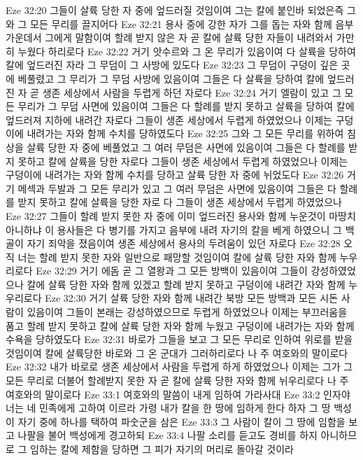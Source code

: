 Eze 32:20  그들이 살륙 당한 자 중에 엎드러질 것임이여 그는 칼에 붙인바 되었은즉 그와 그 모든 무리를 끌지어다
Eze 32:21  용사 중에 강한 자가 그를 돕는 자와 함께 음부 가운데서 그에게 말함이여 할례 받지 않은 자 곧 칼에 살륙 당한 자들이 내려와서 가만히 누웠다 하리로다
Eze 32:22  거기 앗수르와 그 온 무리가 있음이여 다 살륙을 당하여 칼에 엎드러진 자라 그 무덤이 그 사방에 있도다
Eze 32:23  그 무덤이 구덩이 깊은 곳에 베풀렸고 그 무리가 그 무덤 사방에 있음이여 그들은 다 살륙을 당하여 칼에 엎드러진 자 곧 생존 세상에서 사람을 두렵게 하던 자로다
Eze 32:24  거기 엘람이 있고 그 모든 무리가 그 무덤 사면에 있음이여 그들은 다 할례를 받지 못하고 살륙을 당하여 칼에 엎드러져 지하에 내려간 자로다 그들이 생존 세상에서 두렵게 하였었으나 이제는 구덩이에 내려가는 자와 함께 수치를 당하였도다
Eze 32:25  그와 그 모든 무리를 위하여 침상을 살륙 당한 자 중에 베풀었고 그 여러 무덤은 사면에 있음이여 그들은 다 할례를 받지 못하고 칼에 살륙을 당한 자로다 그들이 생존 세상에서 두렵게 하였었으나 이제는 구덩이에 내려가는 자와 함께 수치를 당하고 살륙 당한 자 중에 뉘었도다
Eze 32:26  거기 메섹과 두발과 그 모든 무리가 있고 그 여러 무덤은 사면에 있음이여 그들은 다 할례를 받지 못하고 칼에 살륙을 당한 자로 다 그들이 생존 세상에서 두렵게 하였었으나
Eze 32:27  그들이 할례 받지 못한 자 중에 이미 엎드러진 용사와 함께 누운것이 마땅치 아니하냐 이 용사들은 다 병기를 가지고 음부에 내려 자기의 칼을 베게 하였으니 그 백골이 자기 죄악을 졌음이여 생존 세상에서 용사의 두려움이 있던 자로다
Eze 32:28  오직 너는 할례 받지 못한 자와 일반으로 패망할 것임이여 칼에 살륙 당한 자와 함께 누우리로다
Eze 32:29  거기 에돔 곧 그 열왕과 그 모든 방백이 있음이여 그들이 강성하였었으나 칼에 살륙 당한 자와 함께 있겠고 할례 받지 못하고 구덩이에 내려간 자와 함께 누우리로다
Eze 32:30  거기 살륙 당한 자와 함께 내려간 북방 모든 방백과 모든 시돈 사람이 있음이여 그들이 본래는 강성하였으므로 두렵게 하였었으나 이제는 부끄러움을 품고 할례 받지 못하고 칼에 살륙 당한 자와 함께 누웠고 구덩이에 내려가는 자와 함께 수욕을 당하였도다
Eze 32:31  바로가 그들을 보고 그 모든 무리로 인하여 위로를 받을 것임이여 칼에 살륙당한 바로와 그 온 군대가 그러하리로다 나 주 여호와의 말이로다
Eze 32:32  내가 바로로 생존 세상에서 사람을 두렵게 하게 하였었으나 이제는 그가 그 모든 무리로 더불어 할례받지 못한 자 곧 칼에 살륙 당한 자와 함께 뉘우리로다 나 주 여호와의 말이로다
Eze 33:1  여호와의 말씀이 내게 임하여 가라사대
Eze 33:2  인자야 너는 네 민족에게 고하여 이르라 가령 내가 칼을 한 땅에 임하게 한다 하자 그 땅 백성이 자기 중에 하나를 택하여 파숫군을 삼은
Eze 33:3  그 사람이 칼이 그 땅에 임함을 보고 나팔을 불어 백성에게 경고하되
Eze 33:4  나팔 소리를 듣고도 경비를 하지 아니하므로 그 임하는 칼에 제함을 당하면 그 피가 자기의 머리로 돌아갈 것이라
